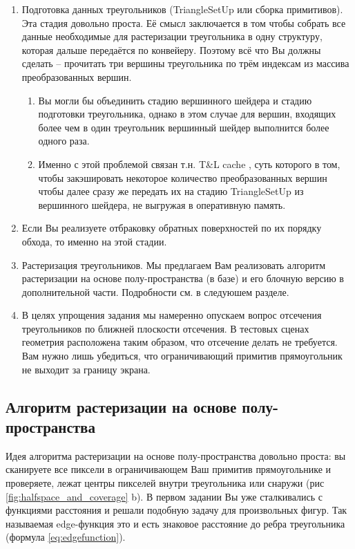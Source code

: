 \documentclass[12pt,subf,href,colorlinks=true]{article}
\begin{document}
\begin{enumerate}
\begin{enumerate}
\end{enumerate}	
\item Подготовка данных треугольников (TriangleSetUp или сборка примитивов). Эта стадия довольно проста. Её смысл заключается в том чтобы собрать все данные необходимые для растеризации треугольника в одну структуру, которая дальше передаётся по конвейеру. Поэтому всё что Вы должны сделать -- прочитать три вершины треугольника по трём индексам из массива преобразованных вершин. 

\begin{enumerate}
\item Вы могли бы объединить стадию вершинного шейдера и стадию подготовки треугольника, однако в этом случае для вершин, входящих более чем в один треугольник вершинный шейдер выполнится более одного раза.

\item Именно с этой проблемой связан т.н. T\&L cache \cite{TnLCache}, суть которого в том, чтобы закэшировать некоторое количество преобразованных вершин чтобы далее сразу же передать их на стадию TriangleSetUp из вершинного шейдера, не выгружая в оперативную память. 
\end{enumerate}	

\item Если Вы реализуете отбраковку обратных поверхностей по их порядку обхода, то именно на этой стадии.

\item Растеризация треугольников. Мы предлагаем Вам реализовать алгоритм растеризации на основе полу-пространства (в базе) и его блочную версию в дополнительной части. Подробности см. в следуюшем разделе.

\item В целях упрощения задания мы намеренно опускаем вопрос отсечения треугольников по ближней плоскости отсечения. В тестовых сценах геометрия расположена таким образом, что отсечение делать не требуется. Вам нужно лишь убедиться, что ограничивающий примитив прямоугольник не выходит за границу экрана.  
\end{enumerate}


\subsection{Алгоритм растеризации на основе полу-пространства}

Идея алгоритма растеризации на основе полу-пространства довольно проста: вы сканируете все пиксели в ограничивающем Ваш примитив прямоугольнике и проверяете, лежат центры пикселей внутри треугольника или снаружи (рис \ref{fig:halfspace_and_coverage} b). В первом задании Вы уже сталкивались с функциями расстояния и решали подобную задачу для произвольных фигур. Так называемая edge-функция это и есть знаковое расстояние до ребра треугольника (формула \ref{eq:edgefunction}).
\end{document}

